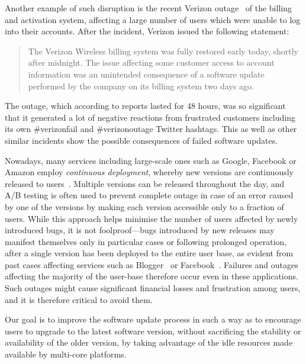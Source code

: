 Another example of such disruption is the recent Verizon
outage~\cite{verizon-outage2014} of the billing and activation system,
affecting a large number of users which were unable to log into their accounts.
After the incident, Verizon issued the following statement:
\begin{quotation}
The Verizon Wireless billing system was fully restored early today, shortly
after midnight. The issue affecting some customer access to account information
was an unintended consequence of a software update performed by the company on
its billing system two days ago.
\end{quotation}
The outage, which according to reports lasted for 48 hours, was so significant 
that it generated a lot of negative reactions from frustrated customers
including its own \textsf{\#verizonfail} and \textsf{\#verizonoutage} Twitter
hashtags. This as well as other similar incidents show the possible
consequences of failed software updates.


Nowadays, many services including large-scale ones such as Google, Facebook or
Amazon employ \emph{continuous deployment}, whereby new versions are
continuously released to users~\cite{johnson2009}. Multiple versions can be
released throughout the day, and A/B testing is often used to prevent complete
outage in case of an error caused by one of the versions by making each version
accessible only to a fraction of users. While this approach helps minimise the
number of users affected by newly introduced bugs, it is not foolproof---bugs
introduced by new releases may manifest themselves only in particular cases or
following prolonged operation, after a single version has been deployed to the
entire user base, as evident from past cases affecting services such as
Blogger~\cite{blogger-incident2011} or Facebook~\cite{facebook-incident2010}.
Failures and outages affecting the majority of the user-base therefore occur
even in these applications. Such outages might cause significant financial
losses and frustration among users, and it is therefore critical to avoid them.

Our goal is to improve the software update process in such a way as to
encourage users to upgrade to the latest software version, without sacrificing
the stability or availability of the older version, by taking advantage of the
idle resources made available by multi-core platforms.

